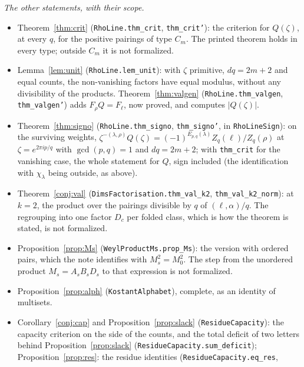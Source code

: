 \documentclass[11pt,a4paper]{article}
\theoremstyle{definition}
\begin{document}
\smallskip
\noindent \emph{The other statements, with their scope.}
\begingroup\sloppy
\begin{itemize}
\item Theorem~\ref{thm:crit} (\texttt{RhoLine.}\allowbreak\texttt{thm\_crit}, \texttt{thm\_crit'}): the criterion for
$Q(\zeta)$, at every $q$, for the positive pairings of type $C_m$. The printed theorem holds in every
type; outside $C_m$ it is not formalized.
\item Lemma~\ref{lem:unit} (\texttt{RhoLine.}\allowbreak\texttt{lem\_unit}): with $\zeta$ primitive, $dq=2m+2$ and equal
counts, the non-vanishing factors have equal modulus, without any divisibility of the products.
Theorem~\ref{thm:valgen} (\texttt{RhoLine.}\allowbreak\texttt{thm\_valgen}, \texttt{thm\_valgen'}) adds
$F_\rho Q=F_\ell$, now proved, and computes $|Q(\zeta)|$.
\item Theorem~\ref{thm:signo} (\texttt{RhoLine.}\allowbreak\texttt{thm\_signo}, \texttt{thm\_signo'}, in
\texttt{RhoLineSign}): on the surviving weights,
$\zeta^{-(\lambda,\rho)}Q(\zeta)=(-1)^{E_{p,q}(\lambda)}Z_q(\ell)/Z_q(\rho)$ at
$\zeta=e^{2\pi ip/q}$ with $\gcd(p,q)=1$ and $dq=2m+2$; with \texttt{thm\_crit} for the vanishing
case, the whole statement for $Q$, sign included (the identification with $\chi_\lambda$ being
outside, as above).
\item Theorem~\ref{conj:val} (\texttt{DimsFactorisation.}\allowbreak\texttt{thm\_val\_k2}, \texttt{thm\_val\_k2\_norm}):
at $k=2$, the product over the pairings divisible by $q$ of $(\ell,\alpha)/q$. The regrouping into
one factor $D_c$ per folded class, which is how the theorem is stated, is not formalized.
\item Proposition~\ref{prop:Ms} (\texttt{WeylProductMs.}\allowbreak\texttt{prop\_Ms}): the version with ordered pairs,
which the note identifies with $M_s^2=M_0^2$. The step from the unordered product $M_s=A_sB_sD_s$
to that expression is not formalized.
\item Proposition~\ref{prop:alph} (\texttt{KostantAlphabet}), complete, as an identity of
multisets.
\item Corollary~\ref{conj:cap} and Proposition~\ref{prop:slack} (\texttt{ResidueCapacity}): the
capacity criterion on the side of the counts, and the total deficit of two letters behind
Proposition~\ref{prop:slack} (\texttt{ResidueCapacity.}\allowbreak\texttt{sum\_deficit});
Proposition~\ref{prop:res}: the residue identities (\texttt{ResidueCapacity.}\allowbreak\texttt{eq\_res},

\end{itemize}
\end{document}
